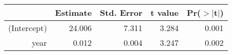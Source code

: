 \begin{table}[ht]
\centering
\begin{tabular}{rrrrr}
  \hline
 & Estimate & Std. Error & t value & Pr($>$$|$t$|$) \\ 
  \hline
(Intercept) & 24.006 & 7.311 & 3.284 & 0.001 \\ 
  year & 0.012 & 0.004 & 3.247 & 0.002 \\ 
   \hline
\end{tabular}
\end{table}
